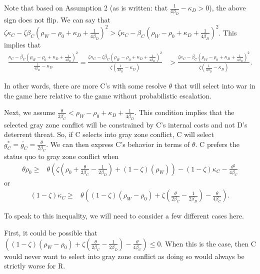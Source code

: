 \documentclass[
]{article}
\begin{document}
Note that based on Assumption 2 (as is written: that \(\frac{1}{4\beta_{D}}-\kappa_{D}>0\)), the above sign does not flip. We can say that \(\zeta\kappa_{C}-\zeta\beta_{C}\left(\rho_{W}-\rho_{0}+\kappa_{D}+\frac{1}{4\beta_{D}}\right)^{2}>\zeta\kappa_{C}-\beta_{C}\left(\rho_{W}-\rho_{0}+\kappa_{D}+\frac{1}{4\beta_{D}}\right)^{2}\). This implies that
\begin{align*}
  \frac{\kappa_{C}-\beta_{C}\left(\rho_{W}-\rho_{0}+\kappa_{D}+\frac{1}{4\beta_{D}}\right)^{2}}{\frac{1}{4\beta_{D}}-\kappa_{D}}=\frac{\zeta\kappa_{C}-\zeta\beta_{C}\left(\rho_{W}-\rho_{0}+\kappa_{D}+\frac{1}{4\beta_{D}}\right)^{2}}{\zeta\left(\frac{1}{4\beta_{D}}-\kappa_{D}\right)} & >\frac{\zeta\kappa_{C}-\beta_{C}\left(\rho_{W}-\rho_{0}+\kappa_{D}+\frac{1}{4\beta_{D}}\right)^{2}}{\zeta\left(\frac{1}{4\beta_{D}}-\kappa_{D}\right)}.
  \end{align*}

In other words, there are more C's with some resolve \(\theta\) that will select into war in the game here relative to the game without probabilistic escalation.

Next, we assume \(\frac{\theta}{2\beta_{C}}<\rho_{W}-\rho_{0}+\kappa_{D}+\frac{1}{4\beta_{D}}\). This condition implies that the selected gray zone conflict will be constrained by C's internal costs and not D's deterrent threat. So, if C selects into gray zone conflict, C will select \(g_{C}^{*}=\check{g_{C}}=\frac{\theta}{2\beta_{C}}\). We can then express C's behavior in terms of \(\theta\). C prefers the status quo to gray zone conflict when
\begin{align*}
  \theta\rho_{0}\geq & \theta\left(\zeta\left(\rho_{0}+\frac{\theta}{2\beta_{C}}-\frac{1}{2\beta_{D}}\right)+(1-\zeta)\left(\rho_{W}\right)\right)-(1-\zeta)\kappa_{C}-\frac{\theta^{2}}{4\beta_{C}}
  \end{align*}
or
\begin{align*}
  (1-\zeta)\kappa_{C}\geq & \theta\left((1-\zeta)(\rho_{W}-\rho_{0})+\zeta\left(\frac{\theta}{2\beta_{C}}-\frac{1}{2\beta_{D}}\right)-\frac{\theta}{4\beta_{C}}\right).
  \end{align*}

To speak to this inequality, we will need to consider a few different cases here.

First, it could be possible that \(\left((1-\zeta)(\rho_{W}-\rho_{0})+\zeta\left(\frac{\theta}{2\beta_{C}}-\frac{1}{2\beta_{D}}\right)-\frac{\theta}{4\beta_{C}}\right)\leq0\). When this is the case, then C would never want to select into gray zone conflict as doing so would always be strictly worse for R.
\end{document}
